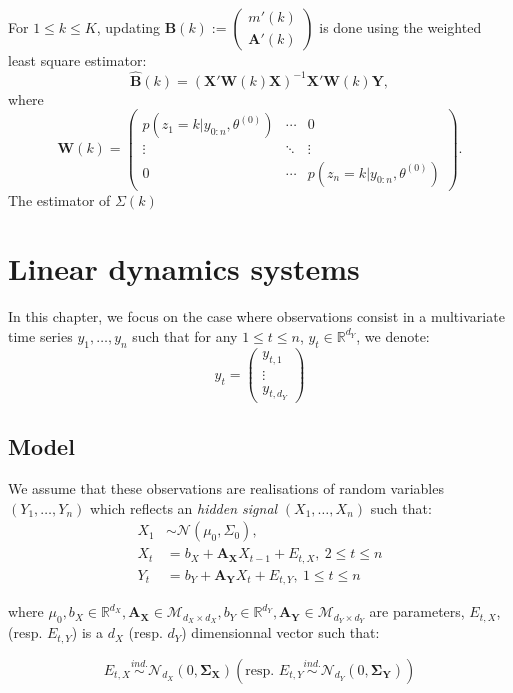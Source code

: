 \documentclass[
]{book}
\begin{document}
For \(1 \leq k\leq K\), updating
\(\mathbf{B}(k) := \begin{pmatrix} m'(k)\\ \mathbf{A}'(k) \end{pmatrix}\) is done using the weighted least square estimator:
\[\widehat{\mathbf{B}}(k) = \left(\mathbf{X}'\mathbf{W}(k)\mathbf{X} \right)^{-1} \mathbf{X}'\mathbf{W}(k) \mathbf{Y},\]
where
\[\mathbf{W}(k) = \begin{pmatrix}p(z_1 = k\vert y_{0:n}, \theta^{(0)}) & \cdots & 0 \\
\vdots & \ddots & \vdots\\
0 & \cdots & p(z_{n} = k\vert y_{0:n}, \theta^{(0)})
\end{pmatrix}.\]
The estimator of \(\Sigma(k)\)

\hypertarget{linear-dynamics-systems}{%
\chapter{Linear dynamics systems}\label{linear-dynamics-systems}}

In this chapter, we focus on the case where observations consist in a multivariate time series \(y_1, \dots, y_n\) such that for any \(1\leq t \leq n\), \(y_t \in \mathbb{R}^{d_Y}\), we denote:
\[
y_t = 
\begin{pmatrix}
y_{t,1}\\
\vdots\\
y_{t, {d_Y}}
\end{pmatrix}
\]

\hypertarget{model-2}{%
\section{Model}\label{model-2}}

We assume that these observations are realisations of random variables \((Y_1,\dots, Y_n)\) which reflects an \emph{hidden signal} \((X_1, \dots, X_n)\) such that:
\begin{align}
X_1 &\sim \mathcal{N}(\mu_0, \Sigma_0),\nonumber \\
X_t &= b_X + \mathbf{A_X}X_{t -1} + E_{t, X},~2\leq t \leq n \label{eq:Hidden-AR}\\
Y_t &= b_Y + \mathbf{A_Y}X_{t} + E_{t, Y},~1\leq t \leq n \label{eq:Observations-distribution}
\end{align}

where \(\mu_0, b_X \in\mathbb{R}^{d_X}, \mathbf{A_X}\in \mathcal{M}_{d_X\times d_X}, b_Y \in\mathbb{R}^{d_Y}, \mathbf{A_Y}\in \mathcal{M}_{d_Y\times d_Y}\) are parameters, \(E_{t, X}\), (resp. \(E_{t, Y}\)) is a \(d_X\) (resp. \(d_Y\)) dimensionnal vector such that:

\[
E_{t, X} \overset{ind.}{\sim} \mathcal{N}_{d_X}\left(0, \mathbf{\Sigma_X}\right) \left(\text{resp. } E_{t, Y} \overset{ind.}{\sim} \mathcal{N}_{d_Y}\left(0, \mathbf{\Sigma_Y}\right)\right)
\]

  
\end{document}
